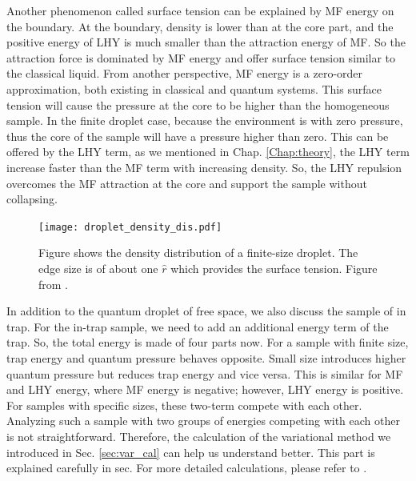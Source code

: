 Another phenomenon called surface tension can be explained by MF energy on the boundary. At the boundary, density is lower than at the core part, and the positive energy of LHY is much smaller than the attraction energy of MF. So the attraction force is dominated by MF energy and offer surface tension similar to the classical liquid. From another perspective, MF energy is a zero-order approximation, both existing in classical and quantum systems. This surface tension will cause the pressure at the core to be higher than the homogeneous sample. In the finite droplet case, because the environment is with zero pressure, thus the core of the sample will have a pressure higher than zero. This can be offered by the LHY term, as we mentioned in Chap. \ref{Chap:theory}, the LHY term increase faster than the MF term with increasing density. So, the LHY repulsion overcomes the MF attraction at the core and support the sample without collapsing.

\begin{figure}[htb]
\begin{center}
\texttt{[image: droplet\_density\_dis.pdf]}
\end{center}
\caption[Droplet density distribution and edge effect]{Figure shows the density distribution of a finite-size droplet. The edge size is of about one $\hat{r}$ which provides the surface tension. Figure from \cite{petrov2015}.}
\label{droplet_density_dis}
\end{figure}

In addition to the quantum droplet of free space, we also discuss the sample of in trap. For the in-trap sample, we need to add an additional energy term of the trap. So, the total energy is made of four parts now. For a sample with finite size, trap energy and quantum pressure behaves opposite. Small size introduces higher quantum pressure but reduces trap energy and vice versa. This is similar for MF and LHY energy, where MF energy is negative; however, LHY energy is positive. For samples with specific sizes, these two-term compete with each other. Analyzing such a sample with two groups of energies competing with each other is not straightforward. Therefore, the calculation of the variational method we introduced in Sec. \ref{sec:var_cal} can help us understand better. This part is explained carefully in sec. For more detailed calculations, please refer to \cite{Liu2020}.

